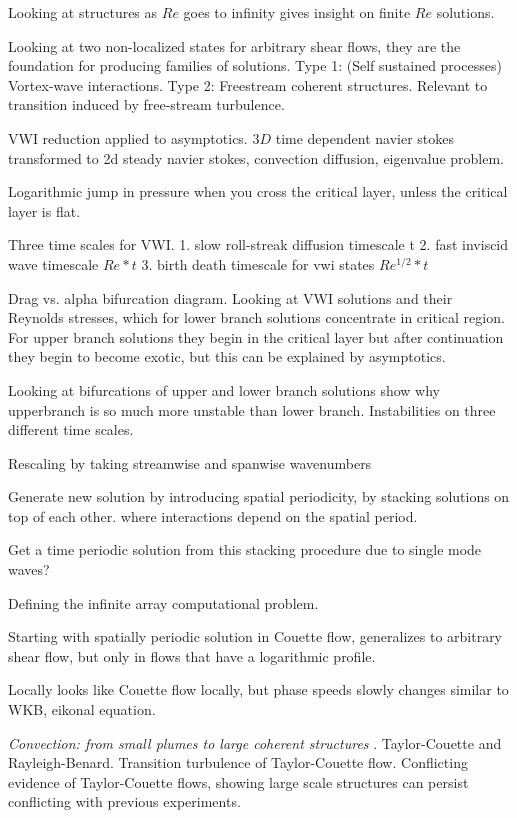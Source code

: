 \begin{description}
{\begin{description}
Looking at structures as $Re$ goes to infinity gives insight on finite $Re$
solutions.

Looking at two non-localized states for arbitrary shear flows, they are the
foundation for producing families of solutions.
Type 1: (Self sustained processes) Vortex-wave interactions.
Type 2: Freestream coherent structures. Relevant to transition induced
by free-stream turbulence.

VWI reduction applied to asymptotics. $3D$ time dependent navier stokes
transformed to 2d steady navier stokes, convection diffusion, eigenvalue
problem.

Logarithmic jump in pressure when you cross the critical layer, unless
the critical layer is flat.

Three time scales for VWI.
1. slow roll-streak diffusion timescale t
2. fast inviscid wave timescale $Re*t$
3. birth death timescale for vwi states $Re^{1/2}*t$

Drag vs. alpha bifurcation diagram.
Looking at VWI solutions and their Reynolds stresses, which for lower
branch solutions concentrate in critical region. For upper branch
solutions they begin in the critical layer but after continuation
they begin to become exotic, but this can be explained by asymptotics.

Looking at bifurcations of upper and lower branch solutions show
why upperbranch is so much more unstable than lower branch.
Instabilities on three different time scales.

Rescaling by taking streamwise and spanwise wavenumbers

Generate new solution by introducing spatial periodicity, by stacking
solutions on top of each other.
where interactions depend on the spatial period.

Get a time periodic solution from this stacking procedure due to
single mode waves?

Defining the infinite array computational problem.

Starting with spatially periodic solution in Couette flow,
generalizes to arbitrary shear flow, but only in flows that
have a logarithmic profile.

Locally looks like Couette flow locally, but phase speeds slowly
changes similar to WKB, eikonal equation.

\item[R. Monaco]
\textit{Convection: from small plumes to large coherent structures}
.
Taylor-Couette and Rayleigh-Benard.
Transition turbulence of Taylor-Couette flow.
Conflicting evidence of Taylor-Couette flows, showing large
scale structures can persist conflicting with previous
experiments.


\end{description}}
\end{description}

